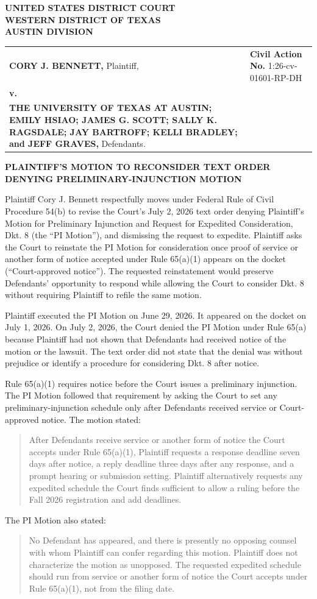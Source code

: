 \documentclass[12pt]{article}
\makeatletter
\providecommand{\FilingCourtName}{UNITED STATES DISTRICT COURT}
\providecommand{\FilingDistrictName}{WESTERN DISTRICT OF TEXAS}
\providecommand{\FilingDivisionName}{AUSTIN DIVISION}
\providecommand{\FilingPlaintiffNameUpper}{CORY J. BENNETT}
\providecommand{\FilingDefendantsInlineUpper}{THE UNIVERSITY OF TEXAS AT AUSTIN; EMILY HSIAO; JAMES G. SCOTT; SALLY K. RAGSDALE; JAY BARTROFF; KELLI BRADLEY; and JEFF GRAVES}
\providecommand{\FilingCivilActionNumber}{}
\renewcommand{\FilingCivilActionNumber}{1:26-cv-01601-RP-DH}
\newcommand{\Caption}{%
  \begin{singlespace}
  \begin{center}
  \textbf{\FilingCourtName}\\
  \textbf{\FilingDistrictName}\\
  \textbf{\FilingDivisionName}
  \end{center}

  \vspace{0.45em}

  \noindent
  \begin{tabularx}{\textwidth}{@{}>{\raggedright\arraybackslash}X>{\raggedright\arraybackslash}p{2.95in}@{}}
  \textbf{\FilingPlaintiffNameUpper,} Plaintiff, & \textbf{Civil Action No.} \FilingCivilActionNumber \\
  \textbf{v.} & \\
  \textbf{\FilingDefendantsInlineUpper,} Defendants. & \\
  \end{tabularx}

  \vspace{1.0em}
  \end{singlespace}%
}
\makeatother
\begin{document}
\Caption

\begin{singlespace}
\begin{center}
\textbf{PLAINTIFF'S MOTION TO RECONSIDER TEXT ORDER DENYING PRELIMINARY-INJUNCTION MOTION}
\end{center}
\end{singlespace}

Plaintiff Cory J. Bennett respectfully moves under Federal Rule of Civil Procedure 54(b) to revise the Court's July 2, 2026 text order denying Plaintiff's Motion for Preliminary Injunction and Request for Expedited Consideration, Dkt. 8 (the ``PI Motion''), and dismissing the request to expedite. Plaintiff asks the Court to reinstate the PI Motion for consideration once proof of service or another form of notice accepted under Rule 65(a)(1) appears on the docket (``Court-approved notice''). The requested reinstatement would preserve Defendants' opportunity to respond while allowing the Court to consider Dkt. 8 without requiring Plaintiff to refile the same motion.

Plaintiff executed the PI Motion on June 29, 2026. It appeared on the docket on July 1, 2026. On July 2, 2026, the Court denied the PI Motion under Rule 65(a) because Plaintiff had not shown that Defendants had received notice of the motion or the lawsuit. The text order did not state that the denial was without prejudice or identify a procedure for considering Dkt. 8 after notice.

Rule 65(a)(1) requires notice before the Court issues a preliminary injunction. The PI Motion followed that requirement by asking the Court to set any preliminary-injunction schedule only after Defendants received service or Court-approved notice. The motion stated:

\begin{quote}
After Defendants receive service or another form of notice the Court accepts under Rule 65(a)(1), Plaintiff requests a response deadline seven days after notice, a reply deadline three days after any response, and a prompt hearing or submission setting. Plaintiff alternatively requests any expedited schedule the Court finds sufficient to allow a ruling before the Fall 2026 registration and add deadlines.
\end{quote}

\noindent
The PI Motion also stated:

\begin{quote}
No Defendant has appeared, and there is presently no opposing counsel with whom Plaintiff can confer regarding this motion. Plaintiff does not characterize the motion as unopposed. The requested expedited schedule should run from service or another form of notice the Court accepts under Rule 65(a)(1), not from the filing date.
\end{quote}
\end{document}
